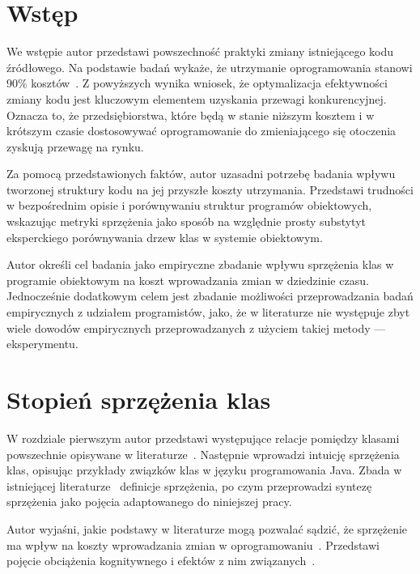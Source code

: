 \chapter{Wstęp}

We wstępie autor przedstawi powszechność praktyki zmiany istniejącego kodu źródłowego.
Na podstawie badań wykaże, że utrzymanie oprogramowania stanowi 90\% kosztów~\cite{dehaghani2013factors}.
Z powyższych wynika wniosek, że optymalizacja efektywności zmiany kodu jest kluczowym elementem uzyskania
przewagi konkurencyjnej.
Oznacza to, że przedsiębiorstwa, które będą w stanie niższym kosztem i w krótszym czasie dostosowywać oprogramowanie do
zmieniającego się otoczenia zyskują przewagę na rynku.

Za pomocą przedstawionych faktów, autor uzasadni potrzebę badania wpływu tworzonej
struktury kodu na jej przyszłe koszty utrzymania.
Przedstawi trudności w bezpośrednim opisie i porównywaniu struktur programów obiektowych, wskazując metryki
sprzężenia jako sposób na względnie prosty substytyt eksperckiego porównywania drzew klas w systemie obiektowym.

Autor określi cel badania jako empiryczne zbadanie wpływu sprzężenia klas w programie obiektowym
na koszt wprowadzania zmian w dziedzinie czasu.
Jednocześnie dodatkowym celem jest zbadanie możliwości przeprowadzania badań empirycznych z udziałem programistów,
jako, że w literaturze nie występuje zbyt wiele dowodów empirycznych przeprowadzanych z użyciem
takiej metody --- eksperymentu.

\chapter{Stopień sprzężenia klas}

W rozdziale pierwszym autor przedstawi występujące relacje pomiędzy klasami
powszechnie opisywane w literaturze~\cite{
    dkabrowski2007modelowanie,Wiener_Pinson_2000
}.
Następnie wprowadzi intuicję sprzężenia klas, opisując przykłady związków klas
w języku programowania Java.
Zbada w istniejącej literaturze~\cite{yourdon1996case:19} definicje sprzężenia,
po czym przeprowadzi syntezę sprzężenia jako pojęcia adaptowanego do niniejszej
pracy.

Autor wyjaśni, jakie podstawy w literaturze mogą pozwalać sądzić, że sprzężenie
ma wpływ na koszty wprowadzania zmian w oprogramowaniu~\cite{yousoof2007measuring}.
Przedstawi pojęcie obciążenia kognitywnego i efektów z nim związanych~\cite{chidamber1991towards}.

